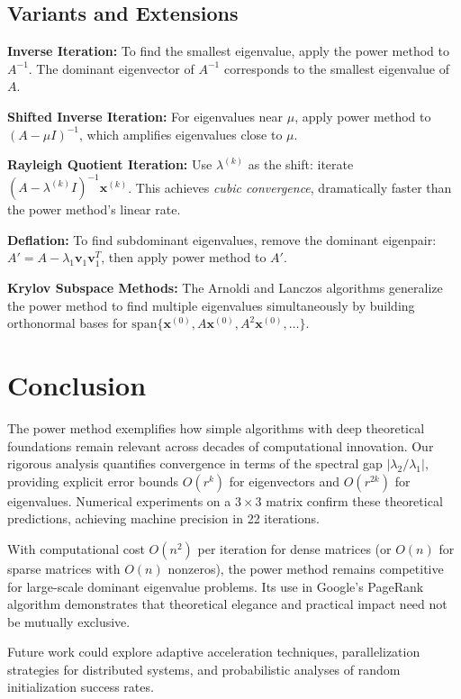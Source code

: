 \documentclass[11pt,a4paper]{article}
\begin{document}
\subsection{Variants and Extensions}

\textbf{Inverse Iteration:} To find the smallest eigenvalue, apply the power method to $A^{-1}$. The dominant eigenvector of $A^{-1}$ corresponds to the smallest eigenvalue of $A$.

\textbf{Shifted Inverse Iteration:} For eigenvalues near $\mu$, apply power method to $(A - \mu I)^{-1}$, which amplifies eigenvalues close to $\mu$.

\textbf{Rayleigh Quotient Iteration:} Use $\lambda^{(k)}$ as the shift: iterate $(A - \lambda^{(k)} I)^{-1} \mathbf{x}^{(k)}$. This achieves \emph{cubic convergence}, dramatically faster than the power method's linear rate.

\textbf{Deflation:} To find subdominant eigenvalues, remove the dominant eigenpair: $A' = A - \lambda_1 \mathbf{v}_1 \mathbf{v}_1^T$, then apply power method to $A'$.

\textbf{Krylov Subspace Methods:} The Arnoldi and Lanczos algorithms generalize the power method to find multiple eigenvalues simultaneously by building orthonormal bases for $\text{span}\{\mathbf{x}^{(0)}, A\mathbf{x}^{(0)}, A^2\mathbf{x}^{(0)}, \ldots\}$.

\section{Conclusion}

The power method exemplifies how simple algorithms with deep theoretical foundations remain relevant across decades of computational innovation. Our rigorous analysis quantifies convergence in terms of the spectral gap $|\lambda_2/\lambda_1|$, providing explicit error bounds $O(r^k)$ for eigenvectors and $O(r^{2k})$ for eigenvalues. Numerical experiments on a $3 \times 3$ matrix confirm these theoretical predictions, achieving machine precision in 22 iterations.

With computational cost $O(n^2)$ per iteration for dense matrices (or $O(n)$ for sparse matrices with $O(n)$ nonzeros), the power method remains competitive for large-scale dominant eigenvalue problems. Its use in Google's PageRank algorithm demonstrates that theoretical elegance and practical impact need not be mutually exclusive.

Future work could explore adaptive acceleration techniques, parallelization strategies for distributed systems, and probabilistic analyses of random initialization success rates.
\end{document}
